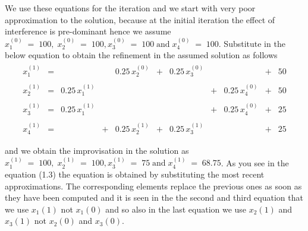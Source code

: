 We use these equations for the iteration and we start with very poor approximation to the solution, because at the initial iteration the effect of interference is pre-dominant hence we assume $x_1^{(0)}\;=\;100,\;x_2^{(0)}\;=\;100,x_3^{(0)}\;=\;100\;\mathrm{and}\; x_4^{(0)}\;=\;100$. Substitute in the below equation to obtain the refinement in the assumed solution as follows
\begin{eqnarray}
\begin{array}{rrrrrrrrrrr}
x_1^{(1)}    &=&             & & 0.25\,x_2^{(0)}   &+& 0.25\,x_3^{(0)}   &&              &+& 50 \\ \\

x_2^{(1)}    &=& 0.25\,x_1^{(1)}   & &             & &             &+& 0.25\,x_4^{(0)}   &+& 50 \\ \\

x_3^{(1)}    &=& 0.25\,x_1^{(1)}   & &             & &             &+& 0.25\,x_4^{(0)}   &+& 25 \\ \\             

x_4^{(1)}    &=& 	     &+& 0.25\,x_2^{(1)}   &+& 0.25\,x_3^{(1)}   & &             &+& 25 \\ \\ 
\end{array}
\end{eqnarray}
and we obtain the improvisation in the solution as $x_1^{(1)}\;=\;100,\;x_2^{(1)}\;=\;100,x_3^{(1)}\;=\;75\;\mathrm{and}\; x_4^{(1)}\;=\;68.75$. As you see in the equation (1.3) the equation is obtained by substituting the most recent approximations. The corresponding elements replace the previous ones as soon as they have been computed and it is seen in the the second and third equation that we use $x_1{(1)}$ not $x_1{(0)}$ and so also in the last equation we use $x_2{(1)}$ and $x_3{(1)}$ not $x_2{(0)}$ and $x_3{(0)}$. \\ 

